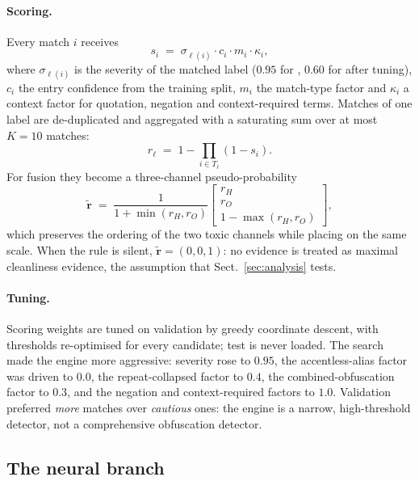 \paragraph{Scoring.}
Every match $i$ receives
\begin{equation}
s_i \;=\; \sigma_{\ell(i)} \cdot c_i \cdot m_i \cdot \kappa_i ,
\label{eq:match}
\end{equation}
where $\sigma_{\ell(i)}$ is the severity of the matched label ($0.95$ for
\hate{}, $0.60$ for \off{} after tuning), $c_i$ the entry confidence from the
training split, $m_i$ the match-type factor and $\kappa_i$ a context factor for
quotation, negation and context-required terms. Matches of one label are
de-duplicated and aggregated with a saturating sum over at most $K=10$ matches:
\begin{equation}
r_\ell \;=\; 1-\prod_{i\in T_\ell}\left(1-s_i\right).
\label{eq:aggregate}
\end{equation}
For fusion they become a three-channel pseudo-probability
\begin{equation}
\tilde{\mathbf r} \;=\; \frac{1}{1+\min(r_H,r_O)}
\begin{bmatrix} r_H \\ r_O \\ 1-\max(r_H,r_O) \end{bmatrix},
\label{eq:pseudo}
\end{equation}
which preserves the ordering of the two toxic channels while placing \clean{} on
the same scale. When the rule is silent, $\tilde{\mathbf r}=(0,0,1)$: no evidence
is treated as maximal cleanliness evidence, the assumption that
Sect.~\ref{sec:analysis} tests.

\paragraph{Tuning.}
Scoring weights are tuned on validation by greedy coordinate descent, with
thresholds re-optimised for every candidate; test is never loaded. The search made
the engine more aggressive: severity \hate{} rose to $0.95$, the accentless-alias
factor was driven to $0.0$, the repeat-collapsed factor to $0.4$, the
combined-obfuscation factor to $0.3$, and the negation and context-required
factors to $1.0$. Validation preferred \emph{more} matches over \emph{cautious} ones:
the engine is a narrow, high-threshold detector, not a comprehensive obfuscation
detector.

\subsection{The neural branch}
\label{sec:neural}

